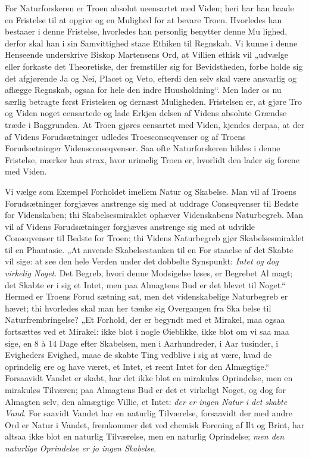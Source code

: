 \documentclass[12pt]{book}
\newcommand{\opage}[1]{\marginnote{\footnotesize\textit{[#1]}}}
\begin{document}
For Naturforskeren er Troen absolut ueensartet med
Viden; heri har han baade en Fristelse til at opgive og en
Mulighed for at bevare Troen. Hvorledes han bestaaer i
denne Fristelse, hvorledes han personlig benytter denne Mu\-%
lighed, derfor skal han i sin Samvittighed staae Ethiken til
Regnskab. Vi kunne i denne Henseende underskrive Biskop
Martensens Ord, at Villien ethisk vil „udvælge eller forkaste
det Theoretiske, der fremstiller sig for Bevidstheden, forbe\-%
holde sig det afgjørende Ja og Nei, Placet og Veto, efterdi
den selv skal være ansvarlig og aflægge Regnskab, ogsaa for
hele den indre Huusholdning“. Men lader os nu særlig
betragte først Fristelsen og dernæst Muligheden. Fristelsen
er, at gjøre Tro og Viden noget eensartede og lade Erkjen\-%
\opage{30}\setcounter{footnote}{0}%
delsen af Videns absolute Grændse træde i Baggrunden.
At Troen gjøres eensartet med Viden, kjendes derpaa, at
der af Videns Forudsætninger udledes Troesconseqvenser
og af Troens Forudsætninger Vidensconseqvenser. Saa ofte
Naturforskeren hildes i denne Fristelse, mærker han strax,
hvor urimelig Troen er, hvorlidt den lader sig forene med
Viden.

Vi vælge som Exempel Forholdet imellem Natur og
Skabelse. Man vil af Troens Forudsætninger forgjæves
anstrenge sig med at uddrage Conseqvenser til Bedste for
Videnskaben; thi Skabelsesmiraklet ophæver Videnskabens
Naturbegreb. Man vil af Videns Forudsætninger forgjæves
anstrenge sig med at udvikle Conseqvenser til Bedste for
Troen; thi Videns Naturbegreb gjør Skabelsesmiraklet til
en Phantasie. „At anvende Skabelsestanken til en For\-%
staaelse af det Skabte vil sige: at see den hele Verden under
det dobbelte Synspunkt: \emph{Intet og dog virkelig Noget}.
Det Begreb, hvori denne Modsigelse løses, er Begrebet Al\-%
magt; det Skabte er i sig et Intet, men paa Almagtens
Bud er det blevet til Noget.“ Hermed er Troens Forud\-%
sætning sat, men det videnskabelige Naturbegreb er hævet;
thi hvorledes skal man her tænke sig Overgangen fra Ska\-%
belse til Naturfrembringelse? „Et Forhold, der er begyndt
med et Mirakel, maa ogsaa fortsættes ved et Mirakel: ikke
blot i nogle Øieblikke, ikke blot om vi saa maa sige, en 8
à 14 Dage efter Skabelsen, men i Aarhundreder, i Aar\-%
tusinder, i Evigheders Evighed, maae de skabte Ting vedblive
i sig at være, hvad de oprindelig ere og have været, et Intet,
et reent Intet for den Almægtige.“ Forsaavidt Vandet er
skabt, har det ikke blot en mirakuløs Oprindelse, men en
mirakuløs Tilværen; paa Almagtens Bud er det et virkeligt
Noget, og dog for Almagten selv, den almægtige Villie, et
Intet: \emph{der er ingen Natur i det skabte Vand}. For\-%
saavidt Vandet har en naturlig Tilværelse, forsaavidt der
\opage{31}\setcounter{footnote}{0}%
med andre Ord er Natur i Vandet, fremkommer det ved
chemisk Forening af Ilt og Brint, har altsaa ikke blot en
naturlig Tilværelse, men en naturlig Oprindelse; \emph{men den
naturlige Oprindelse er jo ingen Skabelse}. %
\end{document}
